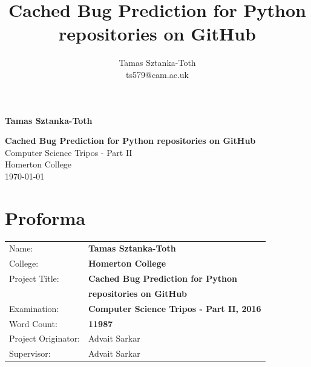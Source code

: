 \documentclass[12pt,twoside,notitlepage]{report}
\title{Cached Bug Prediction for Python repositories on GitHub}
\author{Tamas Sztanka-Toth \\ ts579@cam.ac.uk}
\begin{document}
\setcounter{page}{1}
\pagestyle{plain}



\pagestyle{empty}

\hfill{\LARGE \bf Tamas Sztanka-Toth}

\vspace*{60mm}
\begin{center}
\Huge
{\bf Cached Bug Prediction for Python repositories on GitHub} \\
\vspace*{5mm}
Computer Science Tripos - Part II \\
\vspace*{5mm}
Homerton College \\
\vspace*{5mm}
\today  %
\end{center}

\cleardoublepage


\setcounter{page}{1}
\pagestyle{plain}

\chapter*{Proforma}

{\large
\begin{tabular}{ll}
Name:               & \bf Tamas Sztanka-Toth                       \\
College:            & \bf Homerton College                     \\
Project Title:      & \bf Cached Bug Prediction for Python\\ 						& \bf repositories on GitHub \\
Examination:        & \bf Computer Science Tripos - Part II, 2016        \\
Word Count:         & \bf 11987\footnotemark[1]				 \\
Project Originator: & Advait Sarkar                \\
Supervisor:         & Advait Sarkar                    \\ 
\end{tabular}
}
\end{document}
